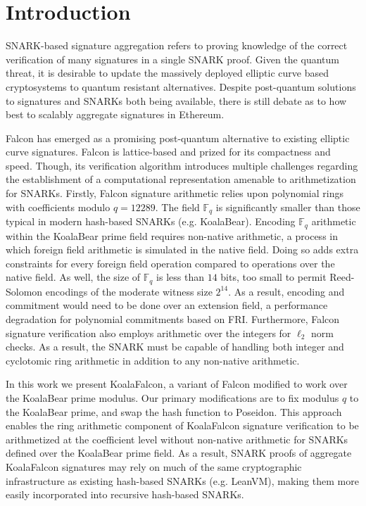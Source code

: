 \section{Introduction}

SNARK-based signature aggregation refers to proving knowledge of the correct 
verification of many signatures in a single SNARK proof. Given the quantum threat, 
it is desirable to update the massively deployed elliptic curve based cryptosystems to 
quantum resistant alternatives. Despite post-quantum solutions to signatures and SNARKs 
both being available, there is still debate as to how best to scalably aggregate signatures 
in Ethereum. 

Falcon has emerged as a promising post-quantum alternative to existing elliptic curve 
signatures. Falcon is lattice-based and prized for its compactness and speed. Though, 
its verification algorithm introduces multiple challenges regarding the establishment of 
a computational representation amenable to arithmetization for SNARKs. Firstly, Falcon 
signature arithmetic relies upon polynomial rings with coefficients modulo $q=12289$. The 
field $\mathbb{F}_q$ is significantly smaller than those typical in modern hash-based 
SNARKs (e.g. KoalaBear). Encoding $\mathbb{F}_q$ arithmetic within the KoalaBear prime 
field requires non-native arithmetic, a process in which foreign field arithmetic is 
simulated in the native field. Doing so adds extra constraints for every foreign field 
operation compared to operations over the native field. As well, the size of $\mathbb{F}_q$ is 
less than $14$ bits, too small to permit Reed-Solomon encodings of the moderate witness 
size $2^{14}$. As a result, encoding and commitment would need to be done over an extension field, 
a performance degradation for polynomial commitments based on FRI. Furthermore, Falcon signature 
verification also employs arithmetic over the integers for $\ell_2$ norm checks.  
As a result, the SNARK must be capable of handling both integer and cyclotomic ring arithmetic 
in addition to any non-native arithmetic.

In this work we present KoalaFalcon, a variant of Falcon modified to work over the 
KoalaBear prime modulus. Our primary modifications are to fix modulus $q$ to the 
KoalaBear prime, and swap the hash function to Poseidon. This approach enables the 
ring arithmetic component of KoalaFalcon signature verification to be arithmetized at the 
coefficient level without non-native arithmetic for SNARKs defined over the KoalaBear 
prime field. As a result, SNARK proofs of aggregate KoalaFalcon signatures may rely on much 
of the same cryptographic infrastructure as existing hash-based SNARKs (e.g. LeanVM), 
making them more easily incorporated into recursive hash-based SNARKs.

